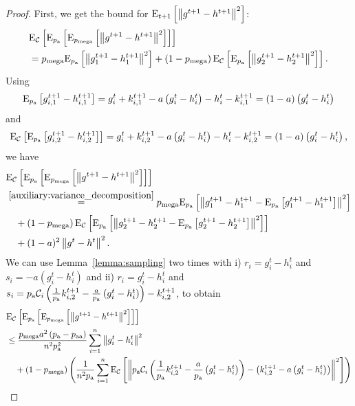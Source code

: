 \documentclass{article}
\newcommand*{\probavailable}{\ensuremath{p_{\textnormal{a}}}}
\newcommand*{\probpairaa}{\ensuremath{p_{\textnormal{aa}}}}
\newcommand*{\probmega}{\ensuremath{p_{\text{mega}}}}
\begin{document}
\begin{proof}
  First, we get the bound for ${\rm E}_{t+1}\left[\left\| g^{t+1} - h^{t+1} \right\|^2\right]$:
  \begin{align*}
    &\ExpSub{\cC}{\ExpSub{\probavailable}{\ExpSub{\probmega}{\norm{g^{t+1} - h^{t+1}}^2}}} \\
    &= \probmega \ExpSub{\probavailable}{\norm{g^{t+1}_1 - h^{t+1}_1}^2} + \left(1 - \probmega\right) \ExpSub{\cC}{\ExpSub{\probavailable}{\norm{g^{t+1}_2 - h^{t+1}_2}^2}}.
  \end{align*}
  Using
  \begin{align*}
    \ExpSub{\probavailable}{g^{t+1}_{i,1} - h^{t+1}_{i,1}} = g^{t}_i + k^{t+1}_{i, 1} - a\left(g^t_i - h^t_i\right) - h^t_i - k^{t+1}_{i, 1} = \left(1 - a\right) \left(g^t_i - h^t_i\right)
  \end{align*}
  and 
  \begin{align*}
    \ExpSub{\cC}{\ExpSub{\probavailable}{g^{t+1}_{i,2} - h^{t+1}_{i,2}}} = g^t_i + k^{t+1}_{i, 2} - a \left(g^t_i - h^{t}_i\right) - h^t_i - k^{t+1}_{i, 2} = (1 - a) \left(g^t_i - h^{t}_i\right),
  \end{align*}
  we have
  \begin{align*}
    &\ExpSub{\cC}{\ExpSub{\probavailable}{\ExpSub{\probmega}{\norm{g^{t+1} - h^{t+1}}^2}}} \\
    &\overset{\eqref{auxiliary:variance_decomposition}}{=} \probmega \ExpSub{\probavailable}{\norm{g^{t+1}_1 - h^{t+1}_1 - \ExpSub{\probavailable}{g^{t+1}_1 - h^{t+1}_1}}^2} \\
    &\quad + \left(1 - \probmega\right) \ExpSub{\cC}{\ExpSub{\probavailable}{\norm{g^{t+1}_2 - h^{t+1}_2 - \ExpSub{\probavailable}{g^{t+1}_2 - h^{t+1}_2}}^2}} \\
    &\quad + (1 - a)^2 \norm{g^{t} - h^{t}}^2.
  \end{align*}
  We can use Lemma~\ref{lemma:sampling} two times with i) $r_i = g^{t}_i - h^{t}_i$ and $s_i = -a\left(g^{t}_i - h^{t}_i\right)$ and ii) $r_i = g^{t}_i - h^{t}_i$ and $s_i = \probavailable\cC_i\left(\frac{1}{\probavailable}k^{t+1}_{i, 2} - \frac{a}{\probavailable} \left(g^t_i - h^{t}_i\right)\right) - k^{t+1}_{i, 2}$, to obtain
  \begin{align*}
    &\ExpSub{\cC}{\ExpSub{\probavailable}{\ExpSub{\probmega}{\norm{g^{t+1} - h^{t+1}}^2}}} \\
    &\leq \frac{\probmega a^2 \left(\probavailable - \probpairaa\right)}{n^2 \probavailable^2}\sum_{i=1}^n\norm{g^{t}_i - h^{t}_i}^2 \\
    &\quad + \left(1 - \probmega\right) \left(\frac{1}{n^2 \probavailable}\sum_{i=1}^n\ExpSub{\cC}{\norm{\probavailable\cC_i\left(\frac{1}{\probavailable}k^{t+1}_{i, 2} - \frac{a}{\probavailable} \left(g^t_i - h^{t}_i\right)\right) - \left(k^{t+1}_{i, 2} - a\left(g^t_i - h^{t}_i\right)\right)}^2}\right)\\

\end{align*}
\end{proof}
\end{document}
